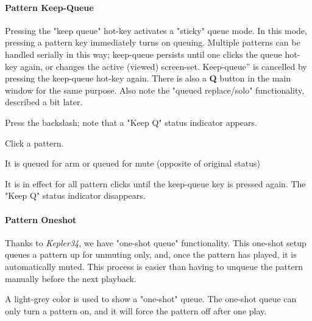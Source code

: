 %

\paragraph{Pattern Keep-Queue}
\label{paragraph:patterns_pattern_keep_queue}

   Pressing the "keep queue" hot-key activates a "sticky" queue mode.
   In this mode, pressing a pattern key immediately turns on queuing.
   Multiple patterns can be handled serially in this way;
   keep-queue persists until one clicks the queue hot-key again,
   or changes the active (viewed) screen-set. 
   Keep-queue” is cancelled by pressing the keep-queue hot-key again.
   There is also a \textbf{Q} button in the main window
   for the same purpose.
   Also note the "queued replace/solo" functionality, described a bit later.

   \begin{enumber}
      \item Press the backslash; note that a "Keep Q" status indicator appears.
      \item Click a pattern.
      \item It is queued for arm or queued for mute (opposite of original status)
      \item It is in effect for all pattern clicks until the keep-queue key
         is pressed again.
         The "Keep Q" status indicator disappears.
   \end{enumber}

\paragraph{Pattern Oneshot}
\label{paragraph:patterns_pattern_oneshot}

   Thanks to \textsl{Kepler34}, we have "one-shot queue"
   functionality.  This one-shot setup queues a pattern up for unmuting only,
   and, once the pattern has played, it is automatically muted.  This process
   is easier than having to unqueue the pattern manually before the next
   playback.

   A light-grey color is used to show a "one-shot" queue.
   The one-shot queue can only turn a pattern on, and it
   will force the pattern off after one play.

